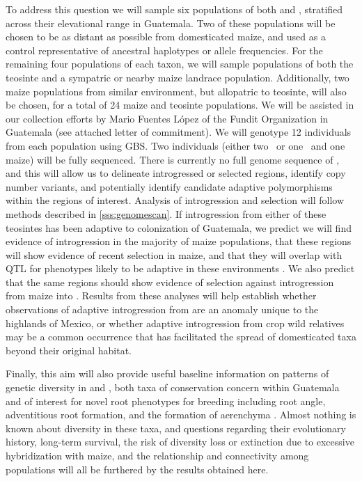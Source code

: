 To address this question we will sample six populations of both \zl{} and \zh{}, stratified across their elevational range in Guatemala.  
Two of these populations will be chosen to be as distant as possible from domesticated maize, and used as a control representative of ancestral haplotypes or allele frequencies.  
For the remaining four populations of each taxon, we will sample populations of both the teosinte and a sympatric or nearby maize landrace population.
Additionally, two maize populations from similar environment, but allopatric to teosinte, will also be chosen, for a total of 24 maize and teosinte populations.
We will be assisted in our collection efforts by Mario Fuentes L\'{o}pez of the Fundit Organization in Guatemala (see attached letter of commitment).
We will genotype 12 individuals from each population using GBS. 
Two individuals (either two \zl\ or one \zl\ and one maize) will be fully sequenced.
There is currently no full genome sequence of \zl, and this will allow us to delineate introgressed or selected regions, identify copy number variants, and potentially identify candidate adaptive polymorphisms within the regions of interest.
Analysis of introgression and selection will follow methods described in \ref{sss:genomescan}.
If introgression from either of these teosintes has been adaptive to colonization of Guatemala, we predict we will find evidence of introgression in the majority of maize populations, that these regions will show evidence of recent selection in maize, and that they will overlap with QTL for phenotypes likely to be adaptive in these environments \citep[e.g.][]{omori2007qtl,mano2008linkage}.
We also predict that the same regions should show evidence of selection against introgression from maize into \zl.
Results from these analyses will help establish whether observations of adaptive introgression from \zm{} are an anomaly unique to the highlands of Mexico, or whether adaptive introgression from crop wild relatives may be a common occurrence that has facilitated the spread of domesticated taxa beyond their original habitat.

Finally, this aim will also provide useful baseline information on patterns of genetic diversity in \zl{} and \zh, both taxa of conservation concern within Guatemala and of interest for novel root phenotypes for breeding including root angle, adventitious root formation, and the formation of aerenchyma \citep{omori2007qtl,mano2007breeding}. 
Almost nothing is known about diversity in these taxa, and questions regarding their evolutionary history, long-term survival, the risk of diversity loss or extinction due to excessive hybridization with maize, and the relationship and connectivity among populations will all be furthered by the results obtained here.

